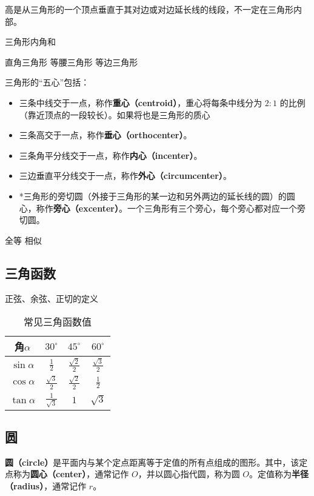 高是从三角形的一个顶点垂直于其对边或对边延长线的线段，不一定在三角形内部。

三角形内角和

直角三角形
等腰三角形
等边三角形


三角形的“五心”包括：
\begin{itemize}
\item 三条中线交于一点，称作\textbf{重心（centroid）}，重心将每条中线分为 $2:1$ 的比例（靠近顶点的一段较长）。如果将也是三角形的质心
\item 三条高交于一点，称作\textbf{垂心（orthocenter）}。
\item 三条角平分线交于一点，称作\textbf{内心（incenter）}。
\item 三边垂直平分线交于一点，称作\textbf{外心（circumcenter）}。
\item *三角形的旁切圆（外接于三角形的某一边和另外两边的延长线的圆）的圆心，称作\textbf{旁心（excenter）}。一个三角形有三个旁心，每个旁心都对应一个旁切圆。
\end{itemize}

全等
相似

\subsection{三角函数}

正弦、余弦、正切的定义

\begin{table}[ht]
\centering
\caption{常见三角函数值}\label{tab_HsGeBa1}
\begin{tabular}{|c|c|c|c|}
\hline
角$\alpha$ & $30^{\circ}$ & $45^{\circ}$ & $60^{\circ}$ \\
\hline
$\sin\alpha$ & $\displaystyle\frac{1}{2}$ & $\displaystyle\frac{\sqrt{2}}{2}$ & $\displaystyle\frac{\sqrt{3}}{2}$ \\
\hline
$\cos\alpha$ & $\displaystyle\frac{\sqrt{3}}{2}$& $\displaystyle\frac{\sqrt{2}}{2}$ &  $\displaystyle\frac{1}{2}$ \\
\hline
$\tan\alpha$ & $\displaystyle\frac{1}{\sqrt{3}}$ & $1$ & $\sqrt{3}$ \\
\hline
\end{tabular}
\end{table}
\subsection{圆}\label{sub_HsGeBa_1}

\textbf{圆（circle）}是平面内与某个定点距离等于定值的所有点组成的图形。其中，该定点称为\textbf{圆心（center）}，通常记作 $O$，并以圆心指代圆，称为圆 $O$。定值称为\textbf{半径（radius）}，通常记作 $r$。


